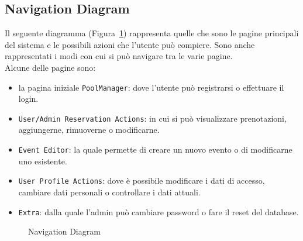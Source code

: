 \documentclass{article}
\begin{document}
\subsection{Navigation Diagram}\label{subsec:navigation-diagram}
Il seguente diagramma (Figura~\ref{fig:navigation-diagram}) rappresenta quelle che sono le pagine principali del sistema e le possibili azioni che l'utente può compiere.
            Sono anche rappresentati i modi con cui si può navigare tra le varie pagine. \\
            Alcune delle pagine sono:
            \begin{itemize}
                \item la pagina iniziale \texttt{PoolManager}: dove l'utente può registrarsi o effettuare il login.
                \item \texttt{User/Admin Reservation Actions}: in cui si può visualizzare prenotazioni, aggiungerne, rimuoverne o modificarne.
                \item \texttt{Event Editor}: la quale permette di creare un nuovo evento o di modificarne uno esistente.
                \item \texttt{User Profile Actions}: dove è possibile modificare i dati di accesso, cambiare dati personali o controllare i dati attuali. 
                \item \texttt{Extra}: dalla quale l'admin può cambiare password o fare il reset del database.
            \end{itemize}
\begin{figure}%
                \centering
                \caption{Navigation Diagram}
                \label{fig:navigation-diagram}
            \end{figure}
            \clearpage
\end{document}
